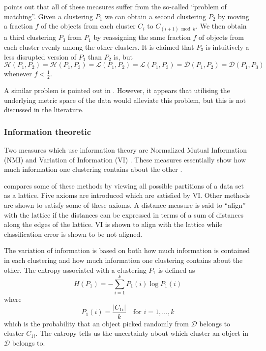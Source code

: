 \documentclass[a4paper]{report}
\begin{document}
\citet{meila-2007} points out that all of these measures suffer from the
so-called ``problem of matching''.  Given a clustering $P_1$ we can obtain a
second clustering $P_2$ by moving a fraction $f$ of the objects from each
cluster $C_i$ to $C_{(i+1)\bmod k}$.  We then obtain a third clustering $P_3$
from $P_1$ by reassigning the same fraction $f$ of objects from each cluster
evenly among the other clusters.  It is claimed that $P_3$ is intuitively a
less disrupted version of $P_1$ than $P_2$ is, but $\mathcal{H}(P_1,P_2) =
\mathcal{H}(P_1,P_3) = \mathcal{L}(P_1,P_2) = \mathcal{L}(P_1,P_3) =
\mathcal{D}(P_1,P_2) = \mathcal{D}(P_1,P_3)$ whenever $f < \frac{1}{2}$.

A similar problem is pointed out in \citet{bae-2010}.  However, it appears
that utilising the underlying metric space of the data would alleviate this
problem, but this is not discussed in the literature.

\subsubsection{Information theoretic}
\label{sec:inform-theor}

Two measures which use information theory are Normalized Mutual Information
(NMI) \citep{fred-jain-2003} and Variation of Information (VI)
\citep{meila-2007}.  These measures essentially show how much information one
clustering contains about the other \citep{bae-2010}.

\citet{meila-2005} compares some of these methods by viewing all possible
partitions of a data set as a lattice.  Five axioms are introduced which are
satisfied by VI.  Other methods are shown to satisfy some of these axioms.
A distance measure is said to ``align'' with the lattice if the distances can
be expressed in terms of a sum of distances along the edges of the lattice.
VI is shown to align with the lattice while classification error is shown to
be not aligned.

The variation of information is based on both how much information is
contained in each clustering and how much information one clustering contains
about the other.  The entropy associated with a clustering $P_1$ is defined as
\begin{equation*}
  H(P_1) = - \sum_{i=1}^{k} P_1(i) \log P_1(i)
\end{equation*}
where
\begin{equation*}
  P_1(i) = \frac{|C_{1i}|}{k} \quad \text{for $i = 1, \dotsc, k$}
\end{equation*}
which is the probability that an object picked randomly from $\mathcal{D}$
belongs to cluster $C_{1i}$.  The entropy tells us the uncertainty about which
cluster an object in $\mathcal{D}$ belongs to.
\end{document}

